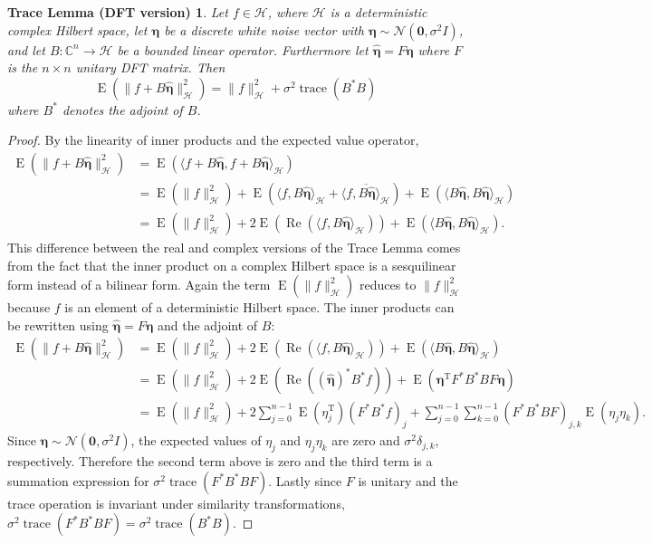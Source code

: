 \documentclass[12pt,notitlepage]{report}
\newcommand{\trans}{\mathrm{T}}	%
\newcommand{\ctrans}{*}	%
\DeclareMathOperator{\trace}{trace}		%
\newcommand{\dft}[1]{\widehat{#1}}	%
\newcommand{\noise}{\eta}	%
\newcommand{\noiseSD}{\sigma}	%
\newcommand{\noiseVec}{\bm{\noise}}	%
\DeclareMathOperator{\E}{E}	%
\renewcommand{\Re}{\operatorname{Re}}	%
\newtheorem*{CTL}{Trace Lemma (DFT version)}
\begin{document}
\begin{CTL}
Let $f \in \mathcal{H}$, where $\mathcal{H}$ is a deterministic complex Hilbert space, let $\noiseVec$ be a discrete white noise vector with $\noiseVec \sim \mathcal{N}(\mathbf{0},\noiseSD^2{I})$, and let $B: \mathbb{C}^n \rightarrow  \mathcal{H}$ be a bounded linear operator. Furthermore let $\dft{\noiseVec} = F\noiseVec$ where $F$ is the $n \times n$ unitary DFT matrix. Then
\[\E(\|f + B\dft{\noiseVec}\|_{\mathcal{H}}^2) = \|f\|_{\mathcal{H}}^2 + \noiseSD^2\trace(B^\ctrans{B})\]
where $B^\ctrans$ denotes the adjoint of $B$.
\end{CTL}
\begin{proof}
By the linearity of inner products and the expected value operator,
\begin{align*}
\E(\|f + B\dft{\noiseVec}\|_{\mathcal{H}}^2) &= \E(\langle f + B\dft{\noiseVec}, f + B\dft{\noiseVec}\rangle_{\mathcal{H}}) \\
&= \E(\|f\|_{\mathcal{H}}^2) + \E\left(\langle f, B\dft{\noiseVec}\rangle_{\mathcal{H}} + \overline{\langle f, B\dft{\noiseVec}\rangle_{\mathcal{H}}}\right) + \E(\langle B\dft{\noiseVec}, B\dft{\noiseVec}\rangle_{\mathcal{H}}) \\
&= \E(\|f\|_{\mathcal{H}}^2) + 2\E\left(\Re(\langle f, B\dft{\noiseVec}\rangle_{\mathcal{H}})\right) + \E(\langle B\dft{\noiseVec}, B\dft{\noiseVec}\rangle_{\mathcal{H}}).
\end{align*}
This difference between the real and complex versions of the Trace Lemma comes from the fact that the inner product on a complex Hilbert space is a sesquilinear form instead of a bilinear form. Again the term $\E(\|f\|_{\mathcal{H}}^2)$ reduces to $\|f\|_{\mathcal{H}}^2$ because $f$ is an element of a deterministic Hilbert space. The inner products can be rewritten using $\dft{\noiseVec} = F\noiseVec$ and the adjoint of $B$:
\begin{align*}
\E(\|f + B\dft{\noiseVec}\|_{\mathcal{H}}^2) &= \E(\|f\|_{\mathcal{H}}^2) + 2\E\left(\Re(\langle f, B\dft{\noiseVec}\rangle_{\mathcal{H}})\right) + \E(\langle B\dft{\noiseVec}, B\dft{\noiseVec}\rangle_{\mathcal{H}}) \\
&= \E(\|f\|_{\mathcal{H}}^2) + 2\E\left(\Re((\dft{\noiseVec})^\ctrans{B^\ctrans}f)\right) + \E(\noiseVec^\trans{F^\ctrans}{B^\ctrans}BF\noiseVec) \\
&= \E(\|f\|_{\mathcal{H}}^2) + 2\sum_{j=0}^{n-1} \E(\noise^\trans_j)(F^\ctrans{B^\ctrans}f)_j + \sum_{j=0}^{n-1}\sum_{k=0}^{n-1} ({F^\ctrans}{B^\ctrans}BF)_{j,k}\E(\noise_j\noise_k).
\end{align*}
Since $\noiseVec \sim \mathcal{N}(\mathbf{0},\noiseSD^2{I})$, the expected values of $\noise_j$ and ${\noise_j}{\noise_k}$ are zero and $\noiseSD^2\delta_{j,k}$, respectively. Therefore the second term above is zero and the third term is a summation expression for $\noiseSD^2\trace(F^\ctrans{B^*}BF)$. Lastly since $F$ is unitary and the trace operation is invariant under similarity transformations, $\noiseSD^2\trace(F^\ctrans{B^*}BF) = \noiseSD^2\trace(B^\ctrans{B})$.
\end{proof}
\end{document}

